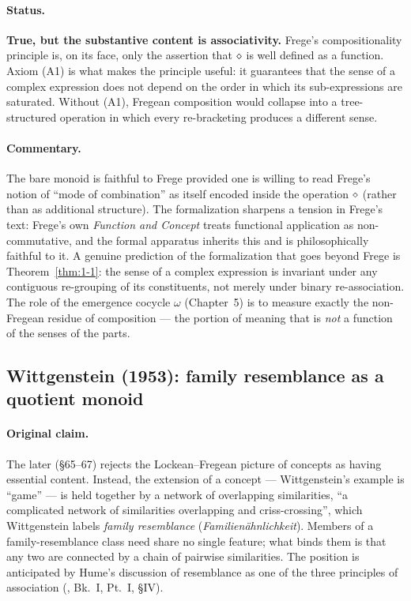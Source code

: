 \paragraph{Status.}
\textbf{True, but the substantive content is associativity.}  Frege's
compositionality principle is, on its face, only the assertion that
$\mathbin{\diamond}$ is well defined as a function.  Axiom (A1) is what makes the
principle useful: it guarantees that the sense of a complex expression
does not depend on the order in which its sub-expressions are saturated.
Without (A1), Fregean composition would collapse into a tree-structured
operation in which every re-bracketing produces a different sense.

\paragraph{Commentary.}
The bare monoid is faithful to Frege provided one is willing to read
Frege's notion of ``mode of combination'' as itself encoded inside the
operation $\mathbin{\diamond}$ (rather than as additional structure).  The
formalization sharpens a tension in Frege's text: Frege's own
\emph{Function and Concept} treats functional application as
non-commutative, and the formal apparatus inherits this and is
philosophically faithful to it.  A genuine prediction of the formalization
that goes beyond Frege is Theorem~\ref{thm:1-1}: the sense of a complex
expression is invariant under any contiguous re-grouping of its
constituents, not merely under binary re-association.  The role of the
emergence cocycle $\omega$ (Chapter~5) is to measure exactly the
non-Fregean residue of composition --- the portion of meaning that is
\emph{not} a function of the senses of the parts.

\subsection*{Wittgenstein (1953): family resemblance as a quotient monoid}\label{zoo:witt}

\paragraph{Original claim.}
The later \cite{Wittgenstein1953} (\S 65--67) rejects the Lockean--Fregean
picture of concepts as having essential content.  Instead, the extension
of a concept --- Wittgenstein's example is ``game'' --- is held together
by a network of overlapping similarities, ``a complicated network of
similarities overlapping and criss-crossing'', which Wittgenstein labels
\emph{family resemblance} (\emph{Familien\"ahnlichkeit}).  Members of a
family-resemblance class need share no single feature; what binds them is
that any two are connected by a chain of pairwise similarities.  The
position is anticipated by Hume's discussion of resemblance as one of the
three principles of association (\cite{Hume1739}, Bk.~I, Pt.~I, \S IV).

